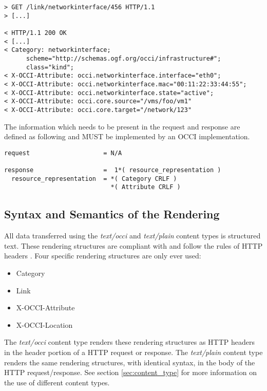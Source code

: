 \documentclass[10pt,a4paper]{article}
\begin{document}
\begin{description}
\begin{verbatim}
> GET /link/networkinterface/456 HTTP/1.1
> [...]

< HTTP/1.1 200 OK
< [...]
< Category: networkinterface;
      scheme="http://schemas.ogf.org/occi/infrastructure#";
      class="kind";
< X-OCCI-Attribute: occi.networkinterface.interface="eth0";
< X-OCCI-Attribute: occi.networkinterface.mac="00:11:22:33:44:55";
< X-OCCI-Attribute: occi.networkinterface.state="active";
< X-OCCI-Attribute: occi.core.source="/vms/foo/vm1"
< X-OCCI-Attribute: occi.core.target="/network/123"
\end{verbatim}

    The information which needs to be present in the request and
    response are defined as following and MUST be implemented by an
    OCCI implementation.

\begin{verbatim}
request                    = N/A

response                   =  1*( resource_representation )
  resource_representation  = *( Category CRLF )
                             *( Attribute CRLF )
\end{verbatim}

\end{description}

\subsection{Syntax and Semantics of the Rendering}
\label{sec:syntax}
All data transferred using the \textit{text/occi} and
\textit{text/plain} content types is structured text. These rendering
structures are compliant with and follow the rules of HTTP headers
\cite{rfc2616}.  Four specific rendering structures are only ever
used:

\begin{itemize}
  \item Category
  \item Link
  \item X-OCCI-Attribute
  \item X-OCCI-Location
\end{itemize}

The \textit{text/occi} content type renders these rendering structures
as HTTP headers in the header portion of a HTTP request or
response. The \textit{text/plain} content type renders the same
rendering structures, with identical syntax, in the body of the HTTP
request/response. See section \ref{sec:content_type} for more
information on the use of different content types.
\end{document}
